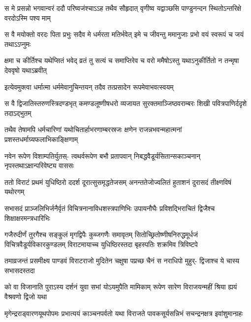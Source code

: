 \fourlineindentedshloka
{स मे प्रसन्नो भगवान्वरं ददौ}
{परिष्वजंश्चाऽऽह तथैव सौहृदात्}
{वृणीष्व यद्वाञ्छसि पाण्डुनन्दन}
{स्थितोऽन्तरिक्षे वरदोऽस्मि पश्य माम्}


\fourlineindentedshloka
{स वै मयोक्तो वरदः पिता प्रभुः}
{सदैव मे धर्मरता मतिर्भवेत्}
{इमे च जीवन्तु ममानुजाः प्रभो}
{वयं स्वरूपं च जयं तथाऽऽप्नुमः}


\fourlineindentedshloka
{क्षमा च कीर्तिश्च यथेप्सितं भवेद्}
{व्रतं तु सत्यं च समाप्तिरेव च}
{वरो ममैषोऽस्तु यथाऽनुकीर्तितो}
{न तन्मृषा देववृषो यथाऽब्रवीत्}



\twolineshloka
{इत्येवमुक्त्वा धर्मात्मा धर्ममेवानुचिन्तयन्}
{तदैव तत्प्रसादेन रूपमेवाभवत्स्वयम्}


\fourlineindentedshloka
{स वै द्विजातिस्तरुणस्त्रिदण्डभृत्}
{कमण्डलूष्णीषधरो व्यजायत}
{सुरक्तमाञ्जिष्ठवराम्बरः शिखी}
{पवित्रपाणिर्ददृशे तदाऽद्भुतम्}


\fourlineindentedshloka
{तथैव तेषामपि धर्मचारिणां}
{यथोचितार्हाभरणाम्बरस्रजः}
{क्षणेन राजन्नभवन्महात्मनां}
{प्रशस्तधर्माग्र्यफलाभिकाङ्क्षिणाम्}


\fourlineindentedshloka
{नवेन रूपेण विशाम्पतिर्युतस्-}
{त्वथर्वरूपेण बभौ प्रतापवान्}
{निबद्धवैडूर्यसितान्सकाञ्चनान्}
{नृपस्तथाऽक्षान्परिवेष्ट्य वाससः}


\fourlineindentedshloka
{ततो विराटं प्रथमं युधिष्ठिरो}
{ददर्श दूरात्सुसमृद्धतेजसम्}
{अनन्ततेजोज्वलितं हुताशनं}
{दुरासदं तीक्ष्णविषं यथोरगम्}


\fourlineindentedshloka
{सभासदं प्राञ्जलिभिर्जनैर्वृतं}
{विचित्रनानाविधशस्त्रपाणिभिः}
{उपायनौघैः प्रविशद्भिराचितं}
{द्विजैश्च शिक्षाक्षरमन्त्रधारिभिः}



\sixlineindentedshloka
{गजैरुदीर्णं तुरगैश्च सङ्कुलं}
{मृगद्विपैः कुब्जगणैः समावृतम्}
{सितोच्छ्रितोष्णीषनिरुद्धमूर्धजं}
{विचित्रवैडूर्यविकारकुण्डलम्}
{विराटमायाच्च युधिष्ठिरस्तदा}
{बृहस्पतिः शक्रमिव त्रिविष्टपे}


\fourlineindentedshloka
{तमाव्रजन्तं प्रसमीक्ष्य पाण्डवं}
{विराटराजो मुदितेन चक्षुषा}
{पप्रच्छ चैनं स नराधिपो मुहुर्-}
{द्विजाश्च ये चास्य सभासदस्तदा}




\fourlineindentedshloka
{को वा विजानाति पुराऽस्य दर्शनं}
{युवा सभां योऽयमुपैति मामिकाम्}
{रूपेण सारेण विराजयन्महीं}
{श्रिया ह्ययं वैश्रवणो द्विजो यथा}


\fourlineindentedshloka
{मृगेन्द्रराड्वारणयूथपोपमः}
{प्रभात्ययं काञ्चनपर्वतो यथा}
{विराजते पावकसूर्यसन्निभं}
{सचन्द्रनक्षत्र इवांशुमान्ग्रहः}


